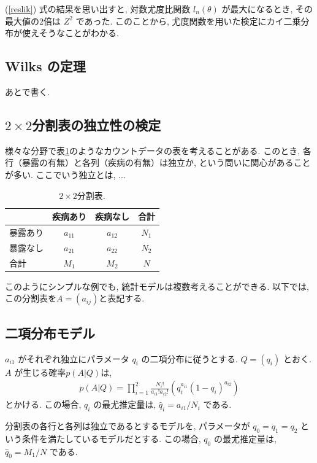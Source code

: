 \documentclass[a4paper, 12pt]{jarticle}
\begin{document}
(\ref{reslik}) 式の結果を思い出すと, 対数尤度比関数 $l_n(\theta)$ が最大になるとき, その最大値の2倍は $Z^2$ であった. このことから, 尤度関数を用いた検定にカイ二乗分布が使えそうなことがわかる. 

\subsection{Wilks の定理}
\label{secWilks}
あとで書く. 

\subsection{$2 \times 2$分割表の独立性の検定}
様々な分野で表\ref{2by2}のようなカウントデータの表を考えることがある. このとき, 各行（暴露の有無）と各列（疾病の有無）は独立か, という問いに関心があることが多い. 
ここでいう独立とは, ...

\begin{table}[htbp]
\centering
\caption{$2 \times 2$分割表.}
\label{2by2}
\begin{tabular}{l|cc|c}
 & 疾病あり&疾病なし&合計\\
 \hline
 暴露あり&$a_{11}$&$a_{12}$&$N_1$\\
 暴露なし&$a_{21}$&$a_{22}$&$N_2$\\
  \hline
 合計 & $M_1$ & $M_2$ & $N$
\end{tabular}
\end{table}

このようにシンプルな例でも, 統計モデルは複数考えることができる. 以下では, この分割表を$A=(a_{ij})$と表記する. 

\subsection{二項分布モデル}
$a_{i1}$ がそれぞれ独立にパラメータ $q_i$ の二項分布に従うとする.  
$Q=(q_i)$ とおく. 
$A$ が生じる確率$p(A|Q)$は, 
\begin{align}
p(A|Q) = \prod_{i=1}^2 \frac{N_i!}{a_{i1}!a_{i2}!}( q_i^{a_{i1}}(1-q_{i})^{a_{i2}})
\end{align}
とかける.
この場合, $q_i$ の最尤推定量は, $\hat q_{i}=a_{i1}/N_i$ である. 

分割表の各行と各列は独立であるとするモデルを, パラメータが $q_0=q_1=q_2$ という条件を満たしているモデルだとする. 
この場合, $q_0$ の最尤推定量は, $\hat q_{0}=M_1/N$ である.
\end{document}
